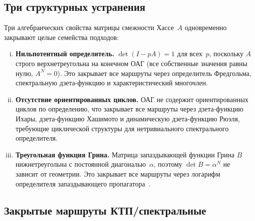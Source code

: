\documentclass[12pt,a4paper]{article}
\theoremstyle{plain}
\theoremstyle{definition}
\theoremstyle{remark}
\begin{document}
\subsection{Три структурных устранения}
\label{sec:killshots}

Три алгебраических свойства матрицы смежности
Хассе~$A$ одновременно закрывают целые семейства подходов:
\begin{enumerate}[(i)]
\item \textbf{Нильпотентный определитель.}  $\det(I - pA) = 1$
  для всех~$p$, поскольку $A$ строго верхнетреугольна на
  конечном ОАГ (все собственные значения равны нулю,
  $A^N = 0$).  Это закрывает все маршруты через определитель
  Фредгольма, спектральную дзета-функцию и характеристический
  многочлен.
\item \textbf{Отсутствие ориентированных циклов.}  ОАГ не
  содержит ориентированных циклов по определению, что
  закрывает все маршруты через дзета-функцию Ихары,
  дзета-функцию Хашимото и динамическую дзета-функцию Рюэля,
  требующие циклической структуры для нетривиального
  спектрального определителя.
\item \textbf{Треугольная функция Грина.}  Матрица
  запаздывающей функции Грина $B$ нижнетреугольна с
  постоянной диагональю~$\alpha$, поэтому
  $\det B = \alpha^N$ не зависит от геометрии.  Это закрывает
  все маршруты через логарифм определителя запаздывающего
  пропагатора~\cite{Johnston:2008,Johnston:2010}.
\end{enumerate}

\subsection{Закрытые маршруты КТП/спектральные}
\label{sec:qft-routes}
\end{document}
